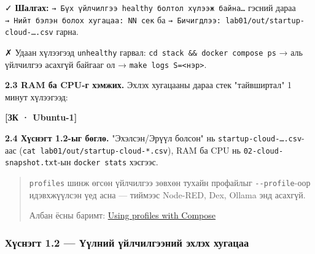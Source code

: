✓ \textbf{Шалгах:} \texttt{→\ Бүх\ үйлчилгээ\ healthy\ болтол\ хүлээж\ байна\ldots{}} гэсний дараа \texttt{→\ Нийт\ бэлэн\ болох\ хугацаа:\allowbreak{}\ NN\ сек} ба \texttt{→\ Бичигдлээ:\allowbreak{}\ lab01/\allowbreak{}out/\allowbreak{}startup-cloud-\ldots{}.\allowbreak{}csv} гарна.

✗ Удаан хүлээгээд \texttt{unhealthy} гарвал: \texttt{cd\ stack\ \&\allowbreak{}\&\allowbreak{}\ docker\ compose\ ps} → аль үйлчилгээ асахгүй байгааг ол → \texttt{make\ logs\ S=\allowbreak{}\textless{}нэр\textgreater{}}.

\textbf{2.3 RAM ба CPU-г хэмжих.} Эхлэх хугацааны дараа стек "тайвширтал" 1 минут хүлээгээд:

\textbf{{[}ЗК · Ubuntu-1{]}}

\begin{Shaded}
\begin{Highlighting}[]
\KeywordTok{|} 
\end{Highlighting}
\end{Shaded}

\textbf{2.4 Хүснэгт 1.2-ыг бөглө.} "Эхэлсэн/Эрүүл болсон" нь \texttt{startup-cloud-\ldots{}.\allowbreak{}csv}-аас (\texttt{cat\ lab01/\allowbreak{}out/\allowbreak{}startup-cloud-*.\allowbreak{}csv}), RAM ба CPU нь \texttt{02-cloud-snapshot.\allowbreak{}txt}-ын \texttt{docker\ stats} хэсгээс.

\begin{quote}
\texttt{profiles} шинж өгсөн үйлчилгээ зөвхөн тухайн профайлыг \texttt{-\/-profile}-оор идэвхжүүлсэн үед асна --- тиймээс Node-RED, Dex, Ollama энд асахгүй.

Албан ёсны баримт: \href{https://docs.docker.com/compose/how-tos/profiles/}{Using profiles with Compose}
\end{quote}

\hypertarget{ux445ux4afux441ux43dux44dux433ux442-1.2-ux4afux4afux43bux43dux438ux439-ux4afux439ux43bux447ux438ux43bux433ux44dux44dux43dux438ux439-ux44dux445ux43bux44dux445-ux445ux443ux433ux430ux446ux430ux430}{%
\subsubsection{Хүснэгт 1.2 --- Үүлний үйлчилгээний эхлэх хугацаа}\label{ux445ux4afux441ux43dux44dux433ux442-1.2-ux4afux4afux43bux43dux438ux439-ux4afux439ux43bux447ux438ux43bux433ux44dux44dux43dux438ux439-ux44dux445ux43bux44dux445-ux445ux443ux433ux430ux446ux430ux430}}

